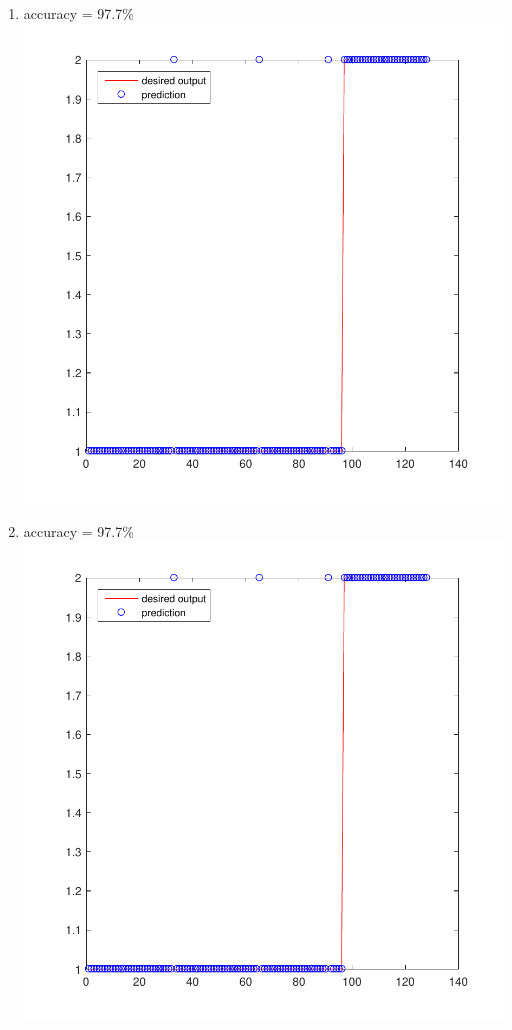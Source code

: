 \documentclass[12pt,a4paper]{article}
\begin{document}
\begin{CJK}{UTF8}{bsmi}
\begin{enumerate}
\begin{enumerate}
\begin{enumerate}
\begin{enumerate}
			\newpage	
			\item accuracy = 97.7\%\ \\
			\includegraphics[scale=0.6]{breastss1}	
			\item accuracy = 97.7\%\ \\
			\includegraphics[scale=0.6]{breastss1}		

\end{enumerate}
\end{enumerate}
\end{enumerate}
\end{enumerate}
\end{CJK}
\end{document}

